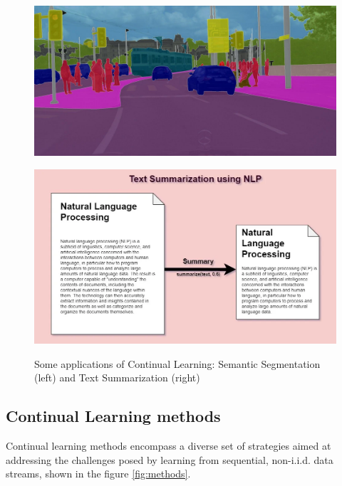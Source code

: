 \documentclass[12pt,a4paper]{article}
\begin{document}
\begin{figure}[!htb]
	\begin{minipage}[t]{0.48\textwidth}
		\centering
		\includegraphics[width=1\linewidth]{assets/semantic_segmentation}
		\label{fig:semanticsegmentation}
	\end{minipage}	
	\begin{minipage}[t]{0.48\textwidth}
		\centering
		\includegraphics[width=1\linewidth]{assets/text_sum}
		\label{fig:textsum}
	\end{minipage}\hfill
	
	\caption{Some applications of Continual Learning: Semantic Segmentation (left) and Text Summarization (right)}
	\label{fig:CLapps}
\end{figure}

\subsection*{Continual Learning methods}
Continual learning methods encompass a diverse set of strategies aimed at addressing the challenges posed by learning from sequential, non-i.i.d. data streams, shown in the figure \ref{fig:methods}.
\end{document}
